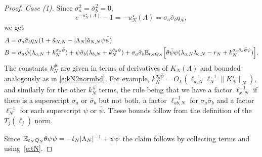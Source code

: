 \documentclass[11pt]{amsart}
\numberwithin{equation}{section}
\numberwithin{theorem}{section}
\newcommand{\1}{{\bf 1}}
\newcommand{\obs}{\star}
\newcommand{\Kobs}{K^\obs}
\newcommand{\ellaN}{\ell_{a,N}}
\newcommand{\ellxN}{\ell_{x,N}}
\newcommand{\ellabN}{\ell_{ab,N}}
\newcommand{\OL}{O_L}
\begin{document}
\begin{proof}
  \noindent\emph{Case (1).}
  Since $\sigma_a^2=\bar\sigma_b^2=0$, 
  \begin{equation}
    e^{-u_N^\obs(\Lambda)}-1=
    -u^\obs_N(\Lambda) = \sigma_a\bar\sigma_b q_N,
  \end{equation}
  we get
  \begin{align}
    A&=\sigma_a\bar\sigma_b q_N (1+\tilde u_{N,N}-|\Lambda_N|\tilde a_{N,N}\psi\bar\psi) 
       \\
    B &=
    \sigma_a\bar\psi(\lambda_{a,N}+k^{\sigma_a\bar\psi}_{N})+{\psi\bar\sigma_{b}}
        (\lambda_{b,N}+k^{\bar\sigma_b\psi}_{N})
        +\sigma_a\bar\sigma_b \mathbb{E}_{t_NQ_N}\Bigl[{\theta \bar\psi\psi (\lambda_{a,N}\lambda_{b,N} - r_N + k^{\sigma_a\bar\sigma_b \bar\psi\psi}_{N})}\Bigr]
        .
  \end{align}
  The constants $k_N^\#$ are given in terms of derivatives of
  $K_N(\Lambda)$ and bounded analogously as in \eqref{e:kN2normbd}.
  For example,
  $k_N^{\sigma_a\bar\psi} = \OL(\ellaN^{-1}\ell_N^{-1}\|\Kobs_N\|_N)$,
  and similarly for the other $k_N^\#$ terms, the rule being that we
  have a factor $\ellxN^{-1}$ if there is a superscript $\sigma_a$ or
  $\bar\sigma_b$ but not both, a factor $\ellabN^{-1}$ for
  $\sigma_a\bar\sigma_b$ and a factor $\ell_N^{-1}$ for each
  superscript $\psi$ or $\bar\psi$.  These bounds follow from the
  definition of the $T_j(\ell_j)$ norm.

  Since $\mathbb{E}_{t_NQ_N}\theta \psi\bar\psi = -t_N|\Lambda_N|^{-1}+\psi\bar\psi$ the claim
  follows by collecting terms and using~\eqref{e:tN}.
  

\end{proof}
\end{document}
